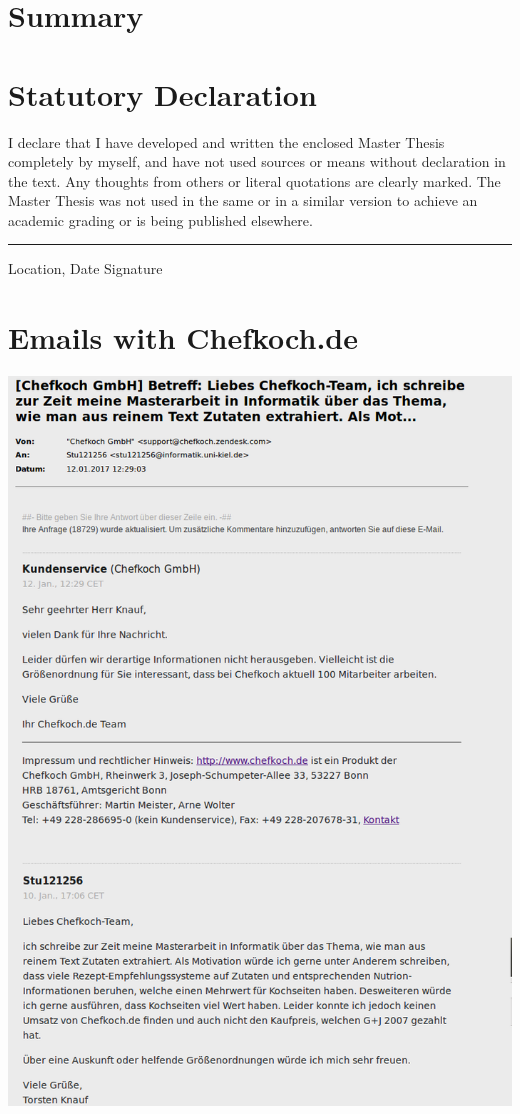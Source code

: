 \documentclass[12pt, twoside]{report}
\begin{document}
\chapter{Summary}


\appendix
\chapter{Statutory Declaration}
I declare that I have developed and written the enclosed Master Thesis completely by myself, and have not used sources or means without declaration in the text. Any thoughts from others or literal quotations are clearly marked. The Master Thesis was not used in the same or in a similar version to achieve an academic grading or is being published elsewhere.
\newline
\newline
\newline
\rule{\textwidth}{1pt}
Location, Date \hfill Signature 

\chapter{Emails with Chefkoch.de} \label{appendix:emailChefkoch}
\vspace{-1cm}
\includegraphics[width=1\linewidth]{Images/emailChefkoch}
\end{document}
